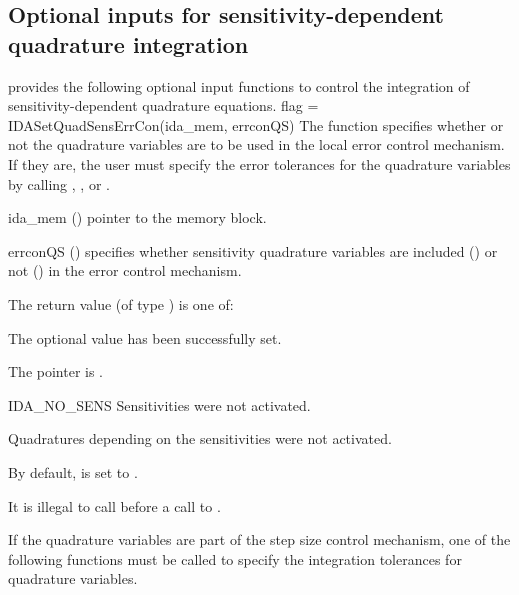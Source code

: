 \subsection{Optional inputs for sensitivity-dependent quadrature integration}
\label{ss:quad_sens_optional_input}
{\idas} provides the following optional input functions to control the integration
of sensitivity-dependent quadrature equations.
{
 flag = IDASetQuadSensErrCon(ida\_mem, errconQS)
}
{
  The function  specifies whether or not the
  quadrature variables are to be used in the local error control mechanism.
  If they are, the user must specify the error tolerances for the quadrature
  variables by calling ,
  , or . 
}
{
  \begin{args}[errconQS]
  \item[ida\_mem] ()
    pointer to the {\idas} memory block.
  \item[errconQS] ()
    specifies whether sensitivity quadrature variables are included () or not
    () in the error control mechanism. 
  \end{args}
}
{
  The return value  (of type ) is one of:
  \begin{args}
  \item[\Id{IDA\_SUCCESS}] 
    The optional value has been successfully set.
  \item[\Id{IDA\_MEM\_NULL}]
    The  pointer is .
  \item[IDA\_NO\_SENS]
    Sensitivities were not activated.
  \item[\Id{IDA\_NO\_QUADSENS}] 
    Quadratures depending on the sensitivities were not activated.
  \end{args}
}
{
  By default,  is set to . 

  {\warn}It is illegal to call  before a call 
  to .
}


If the quadrature variables are part of the step size control mechanism, 
one of the following functions must be called to specify the
integration tolerances for quadrature variables. 

